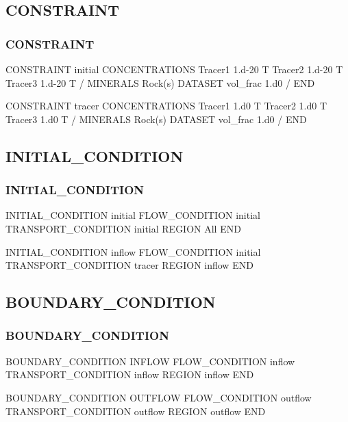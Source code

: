 \documentclass{beamer}
\begin{document}

\subsection{CONSTRAINT}
\begin{frame}\frametitle{CONSTRAINT}
	
	\begin{semiverbatim}
CONSTRAINT initial
  CONCENTRATIONS
    Tracer1 1.d-20 T
    Tracer2 1.d-20 T
    Tracer3 1.d-20 T
  /
  MINERALS
    Rock(s) DATASET vol_frac 1.d0
  /
END

CONSTRAINT tracer
  CONCENTRATIONS
    Tracer1 1.d0 T
    Tracer2 1.d0 T
    Tracer3 1.d0 T
  /
  MINERALS
    Rock(s) DATASET vol_frac 1.d0
  /
END
	\end{semiverbatim}
\end{frame}


\subsection{INITIAL\_CONDITION}
\begin{frame}\frametitle{INITIAL\_CONDITION}
	
	\begin{semiverbatim}
INITIAL_CONDITION initial
  FLOW_CONDITION initial
  TRANSPORT_CONDITION initial
  REGION All
END

INITIAL_CONDITION inflow
  FLOW_CONDITION initial
  TRANSPORT_CONDITION tracer
  REGION inflow
END
	\end{semiverbatim}
	
\end{frame}


\subsection{BOUNDARY\_CONDITION}
\begin{frame}\frametitle{BOUNDARY\_CONDITION}
	
	\begin{semiverbatim}
BOUNDARY_CONDITION INFLOW
  FLOW_CONDITION inflow
  TRANSPORT_CONDITION inflow
  REGION inflow
END

BOUNDARY_CONDITION OUTFLOW
  FLOW_CONDITION outflow
  TRANSPORT_CONDITION outflow
  REGION outflow
END
	\end{semiverbatim}
	
\end{frame}
\end{document}
